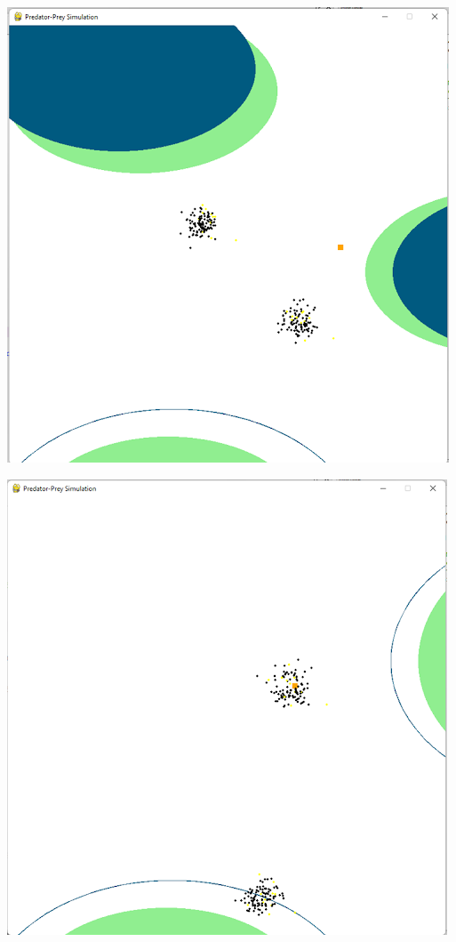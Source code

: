 \documentclass[12pt]{article}
\begin{document}
\begin{center}
\includegraphics[scale=.5]{figure1.png}%
\label{labelname}%
\end{center}

\begin{center}
\includegraphics[scale=.5]{figure2.png}%
\label{labelname}%
\end{center}
\end{document}
